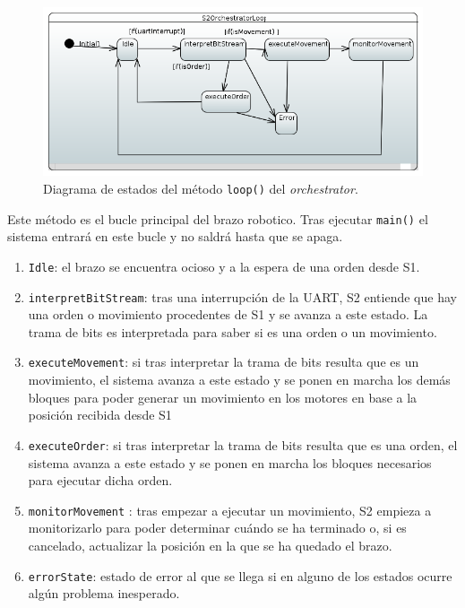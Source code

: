 \begin{figure}[H]
    \centering
    \includegraphics[width=1\linewidth]{pictures/S2OrchestratorLoop.PNG}
    \caption{Diagrama de estados del método \texttt{loop()} del \textit{orchestrator}.}
    \label{fig:fun_loop_orchestrator}
\end{figure}

Este método es el bucle principal del brazo robotico. Tras ejecutar \texttt{main()} el sistema entrará en este bucle y no saldrá hasta que se apaga.

\begin{enumerate}
    \item \texttt{Idle}: el brazo se encuentra ocioso y a la espera de una orden desde \ac{S1}.
    \item \texttt{interpretBitStream}: tras una interrupción de la \ac{UART}, \ac{S2} entiende que hay una orden o movimiento procedentes de \ac{S1} y se avanza a este estado. La trama de bits es interpretada para saber si es una orden o un movimiento.
    \item \texttt{executeMovement}: si tras interpretar la trama de bits resulta que es un movimiento, el sistema avanza a este estado y se ponen en marcha los demás bloques para poder generar un movimiento en los motores en base a la posición recibida desde \ac{S1}
    \item \texttt{executeOrder}: si tras interpretar la trama de bits resulta que es una orden, el sistema avanza a este estado y se ponen en marcha los bloques necesarios para ejecutar dicha orden.
    \item \texttt{monitorMovement} : tras empezar a ejecutar un movimiento, \ac{S2} empieza a monitorizarlo para poder determinar cuándo se ha terminado o, si es cancelado, actualizar la posición en la que se ha quedado el brazo.
    \item \texttt{errorState}: estado de error al que se llega si en alguno de los estados ocurre algún problema inesperado. 
\end{enumerate}

